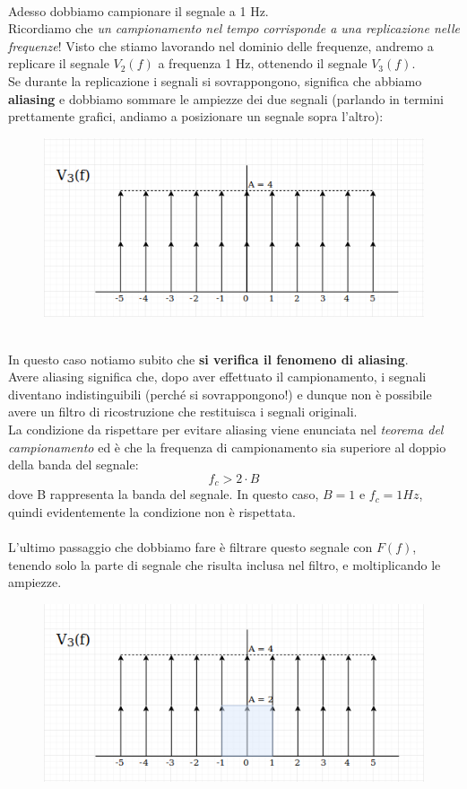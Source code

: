\documentclass[12pt,a4paper]{article}
\begin{document}
	\\Adesso dobbiamo campionare il segnale a 1 Hz. \\Ricordiamo che \textit{un campionamento nel tempo corrisponde a una replicazione nelle frequenze}! Visto che stiamo lavorando nel dominio delle frequenze, andremo a replicare il segnale $V_2(f)$ a frequenza 1 Hz, ottenendo il segnale $V_3(f)$.\\Se durante la replicazione i segnali si sovrappongono, significa che abbiamo \textbf{aliasing} e dobbiamo sommare le ampiezze dei due segnali (parlando in termini prettamente grafici, andiamo a posizionare un segnale sopra l'altro):
	\begin{figure}[h!]
		\centering
		\includegraphics[scale=0.4]{./images/fourier56.png}
	\end{figure}
	\\In questo caso notiamo subito che \textbf{si verifica il fenomeno di aliasing}.\\ Avere aliasing significa che, dopo aver effettuato il campionamento, i segnali diventano indistinguibili (perché si sovrappongono!) e dunque non è possibile avere un filtro di ricostruzione che restituisca i segnali originali.\\La condizione da rispettare per evitare aliasing viene enunciata nel \textit{teorema del campionamento} ed è che la frequenza di campionamento sia superiore al doppio della banda del segnale:
	\[
		f_c > 2\cdot B
	\]
	dove B rappresenta la banda del segnale. In questo caso, $B = 1$ e $f_c = 1Hz$, quindi evidentemente la condizione non è rispettata.\\\\L'ultimo passaggio che dobbiamo fare \`e filtrare questo segnale con $F(f)$, tenendo solo la parte di segnale che risulta inclusa nel filtro, e moltiplicando le ampiezze.\\
	\begin{figure}[h!]
		\centering
		\includegraphics[scale=0.4]{./images/fourier57.png}
	\end{figure}
\end{document}
